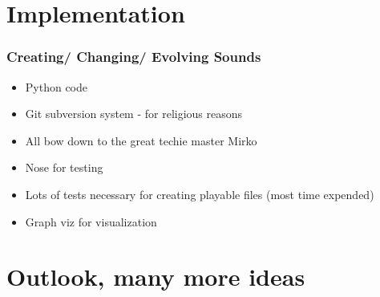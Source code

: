 \documentclass{beamer}
\begin{document}


\section{Implementation} %
\begin{frame}
	\frametitle{Creating/ Changing/ Evolving Sounds}
	\begin{itemize}
	\item<1-> Python code 
	\item<2-> Git subversion system - for religious reasons
	\item<3-> All bow down to the great techie master Mirko
	\item<4-> Nose for testing 
	\item<5-> Lots of tests necessary for creating playable files (most time expended)
	\item<6-> Graph viz for visualization
         \end{itemize}

\end{frame}


\label{sg:sec:imple}




\section{Outlook, many more ideas} %
\label{sg:sec:outlook_many_more_ideas}


\end{document}
